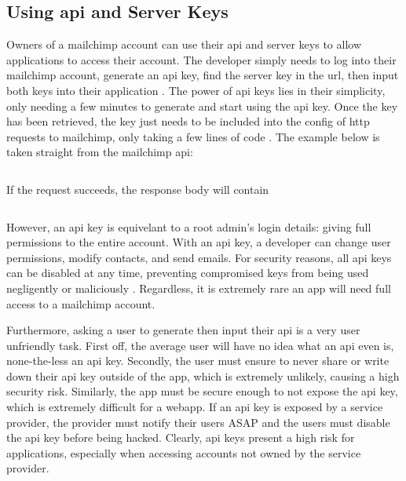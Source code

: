 \documentclass[11pt]{article}
\begin{document}
\subsection{Using \acrshort{api} and Server Keys}

Owners of a \Gls{mailchimp} account can use their \acrshort{api} and \gls{server} keys to allow applications to access their account. The developer simply needs to log into their \Gls{mailchimp} account, generate an \acrshort{api} key, find the \gls{server} key in the \acrshort{url}, then input both keys into their application \cite{mailchimp-api-key}. The power of \acrshort{api} keys lies in their simplicity, only needing a few minutes to generate and start using the \acrshort{api} key. Once the key has been retrieved, the key just needs to be included into the config of \acrshort{http} \glspl{request} to \Gls{mailchimp}, only taking a few lines of code \cite{mailchimp-first-api-call}. The example below is taken straight from the \Gls{mailchimp} \acrshort{api}:

\inputminted[linenos=true]{python}{mailchimp_examples/mailchimp_ping.py}

\noindent
If the \gls{request} succeeds, the \gls{response} body will contain

\inputminted{json}{mailchimp_examples/ping_response.json}

However, an \acrshort{api} key is equivelant to a root admin's login details: giving full permissions to the entire account. With an \acrshort{api} key, a developer can change \gls{user} permissions, modify contacts, and send emails. For security reasons, all \acrshort{api} keys can be disabled at any time, preventing compromised keys from being used negligently or maliciously \cite{mailchimp-api-key}. Regardless, it is extremely rare an app will need full access to a \Gls{mailchimp} account.

Furthermore, asking a \gls{user} to generate then input their \acrshort{api} is a very user unfriendly task. First off, the average user will have no idea what an \acrshort{api} even is, none-the-less an \acrshort{api} key. Secondly, the user must ensure to never share or write down their \acrshort{api} key outside of the app, which is extremely unlikely, causing a high security risk. Similarly, the app must be secure enough to not expose the \acrshort{api} key, which is extremely difficult for a \gls{webapp}. If an \acrshort{api} key is exposed by a service provider, the provider must notify their users ASAP and the users must disable the \acrshort{api} key before being hacked. Clearly, \acrshort{api} keys present a high risk for applications, especially when accessing accounts not owned by the service provider.
\end{document}

